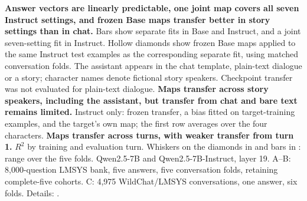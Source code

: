 \caption{ \textbf{Answer vectors are linearly predictable, one joint map covers all seven Instruct settings, and frozen Base maps transfer better in story settings than in chat.} Bars show separate fits in Base and Instruct, and a joint seven-setting fit in Instruct. Hollow diamonds show frozen Base maps applied to the same Instruct test examples as the corresponding separate fit, using matched conversation folds. The assistant appears in the chat template, plain-text dialogue or a story; character names denote fictional story speakers. Checkpoint transfer was not evaluated for plain-text dialogue.  \textbf{Maps transfer across story speakers, including the assistant, but transfer from chat and bare text remains limited.} Instruct only: frozen transfer, a bias fitted on target-training examples, and the target's own map; the first row averages over the four characters.  \textbf{Maps transfer across turns, with weaker transfer from turn 1.} $R^2$ by training and evaluation turn. Whiskers on the diamonds in  and bars in : range over the five folds. Qwen2.5-7B and Qwen2.5-7B-Instruct, layer 19. A--B: 8,000-question LMSYS bank, five answers, five conversation folds, retaining complete-five cohorts. C: 4,975 WildChat/LMSYS conversations, one answer, six folds. Details: .}
